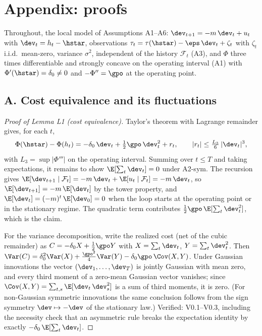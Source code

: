 \documentclass[11pt]{article}
\begin{document}
\section*{Appendix: proofs}

Throughout, the local model of Assumptions A1--A6:
$\dev_{t+1} = -m\,\dev_t + u_t$ with $\dev_t = h_t - \hstar$,
observations $\tau_t = \tau(\hstar) - \eps\,\dev_t + \zeta_t$ with
$\zeta_t$ i.i.d.\ mean-zero, variance $\sigma^2$, independent of the history
$\mathcal{F}_t$ (A3), and $\Phi$ three times differentiable and strongly
concave on the operating interval (A1) with $\Phi'(\hstar) = \delta_0 \neq 0$
and $-\Phi''=\gpo$ at the operating point.


\subsection*{A. Cost equivalence and its fluctuations}

\begin{proof}[Proof of Lemma L1 (cost equivalence)]
Taylor's theorem with Lagrange remainder gives, for each $t$,
\[
\Phi(\hstar) - \Phi(h_t)
 = -\delta_0\,\dev_t + \tfrac{1}{2}\gpo\,\dev_t^2 + r_t,
 \qquad |r_t| \le \tfrac{L_3}{6}\,|\dev_t|^3,
\]
with $L_3 = \sup |\Phi'''|$ on the operating interval. Summing over
$t \le T$ and taking expectations, it remains to show
$\E[\sum_t \dev_t] = 0$ under A2-sym. The recursion gives
$\E[\dev_{t+1} \mid \mathcal{F}_t] = -m\,\dev_t + \E[u_t \mid \mathcal{F}_t]
= -m\,\dev_t$, so $\E[\dev_{t+1}] = -m\,\E[\dev_t]$ by the tower property,
and $\E[\dev_t] = (-m)^t\,\E[\dev_0] = 0$ when the loop starts at the
operating point or in the stationary regime. The quadratic term contributes
$\tfrac{1}{2}\gpo\,\E[\sum_t \dev_t^2]$, which is the claim.

For the variance decomposition, write the realized cost (net of the cubic
remainder) as $C = -\delta_0 X + \tfrac{1}{2}\gpo Y$ with
$X = \sum_t \dev_t$, $Y = \sum_t \dev_t^2$. Then
$\Var(C) = \delta_0^2 \Var(X) + \tfrac{\gpo^2}{4}\Var(Y)
- \delta_0\gpo\,\Cov(X, Y)$. Under Gaussian innovations the vector
$(\dev_1,\dots,\dev_T)$ is jointly Gaussian with mean zero, and every third
moment of a zero-mean Gaussian vector vanishes; since
$\Cov(X,Y) = \sum_{t,s}\E[\dev_t\,\dev_s^2]$ is a sum of third moments, it is
zero. (For non-Gaussian symmetric innovations the same conclusion follows
from the sign symmetry $\dev \mapsto -\dev$ of the stationary law.)
Verified: V0.1--V0.3, including the necessity check that an asymmetric rule
breaks the expectation identity by exactly $-\delta_0\,\E[\sum_t \dev_t]$.
\end{proof}
\end{document}
